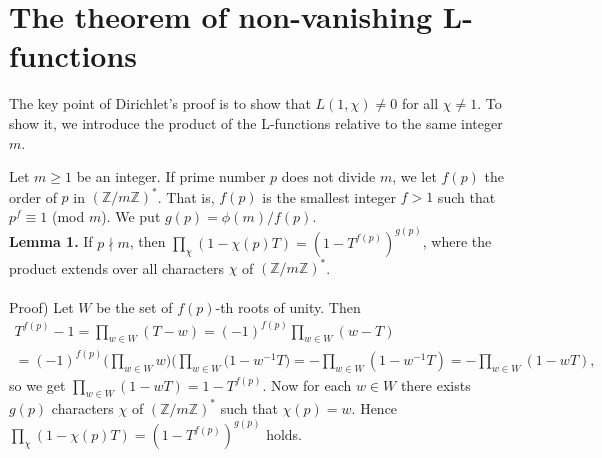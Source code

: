 \documentclass[11pt]{article}
\begin{document}
\section{The theorem of non-vanishing L-functions}
The key point of Dirichlet's proof is to show that $L(1,\chi)\neq 0$ for all $\chi\neq 1$. To show it, we introduce the product of the L-functions relative to the same integer $m$.
\\
\par Let $m\geq 1$ be an integer. If prime number $p$ does not divide $m$, we let $f(p)$ the order of $p$ in $(\mathbb{Z}/m\mathbb{Z})^*$. That is, $f(p)$ is the smallest integer $f>1$ such that $p^f\equiv 1$ (mod $m$). We put $g(p)=\phi(m)/f(p)$.
\vspace{5mm}
\\
\textbf{Lemma 1.}
If $p\nmid m$, then $\displaystyle\prod_{\chi}(1-\chi(p)T)=(1-T^{f(p)})^{g(p)}$, where the product extends over all characters $\chi$ of $(\mathbb{Z}/m\mathbb{Z})^*$.
\\
\\
Proof) Let $W$ be the set of $f(p)$-th roots of unity. Then 
\begin{multline*}
T^{f(p)}-1=\displaystyle\prod_{w\in W}(T-w)=(-1)^{f(p)}\displaystyle\prod_{w\in W}(w-T)
\\=(-1)^{f(p)}\Big(\displaystyle\prod_{w\in W}w\Big)\Big(\displaystyle\prod_{w\in W}(1-w^{-1}T\Big)
=-\displaystyle\prod_{w\in W}(1-w^{-1}T)=-\displaystyle\prod_{w\in W}(1-wT),
\end{multline*}
so we get $\displaystyle\prod_{w\in W}(1-wT)=1-T^{f(p)}$. Now for each $w\in W$ there exists $g(p)$ characters $\chi$ of $(\mathbb{Z}/m\mathbb{Z})^*$ such that $\chi(p)=w$. Hence $\displaystyle\prod_{\chi}(1-\chi(p)T)=(1-T^{f(p)})^{g(p)}$ holds.
\vspace{6mm}
\end{document}
